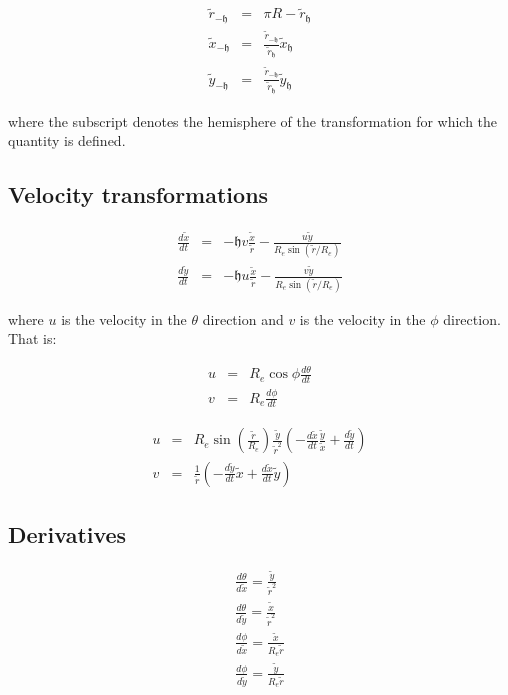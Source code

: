 \documentclass[12pt]{report}
\begin{document}
\begin{flushleft}
\begin{eqnarray}
\tilde r_{-\mathfrak h} & = & \pi R - \tilde r_{\mathfrak h} \\
\tilde x_{-\mathfrak h} & = & \frac {\tilde r_{-\mathfrak h} } 
	{\tilde r_{\mathfrak h}} \tilde x_{\mathfrak h} \\
\tilde y_{-\mathfrak h} & = & \frac {\tilde r_{-\mathfrak h} } 
	{\tilde r_{\mathfrak h}} \tilde y_{\mathfrak h}
\end{eqnarray}

where the subscript denotes the hemisphere of the transformation for which the quantity is defined.

\subsection{Velocity transformations}

\begin{eqnarray}
\frac{d \tilde x}{dt} & = & - \mathfrak h v \frac{\tilde x}{\tilde r} - 
		\frac{u \tilde y}{R_e \sin (\tilde r/R_e)} \\
\frac{d \tilde y}{dt} & = & - \mathfrak h u \frac{\tilde x}{\tilde r} - 
		\frac{v \tilde y}{R_e \sin (\tilde r/R_e)}
\end{eqnarray}

where $u$ is the velocity in the $\theta$ direction and $v$ is the velocity in
the $\phi$ direction.  That is:

\begin{eqnarray}
u & = & R_e \cos \phi \frac{d \theta}{dt} \\
v & = & R_e \frac{d \phi}{dt}
\end{eqnarray}

\begin{eqnarray}
u & = & R_e \sin \left (\frac{\tilde r}{R_e} \right ) \frac{\tilde y}{\tilde r^2}
		\left (-\frac{d \tilde x}{dt} \frac{\tilde y}{\tilde x} + 
		\frac{d \tilde y}{dt} \right ) \\
v & = & \frac{1}{\tilde r} \left (-\frac{d \tilde y}{dt} {\tilde x} + 
		\frac{d \tilde x}{dt} \tilde y \right )
\end{eqnarray}

\subsection{Derivatives}

\begin{eqnarray}
\frac{d \theta}{d \tilde x} = \frac{\tilde y}{\tilde r^2} \\
\frac{d \theta}{d \tilde y} = \frac{\tilde x}{\tilde r^2} \\
\frac{d \phi}{d \tilde x} = \frac{\tilde x}{R_e \tilde r} \\
\frac{d \phi}{d \tilde y} = \frac{\tilde y}{R_e \tilde r} \\
\end{eqnarray}


\end{flushleft}
\end{document}
